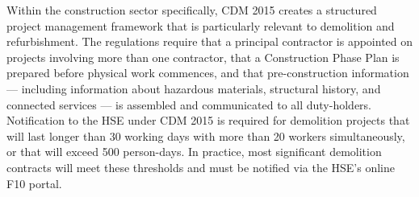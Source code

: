 Within the construction sector specifically, CDM 2015 creates a structured project management framework that is particularly relevant to demolition and refurbishment. The regulations require that a principal contractor is appointed on projects involving more than one contractor, that a Construction Phase Plan is prepared before physical work commences, and that pre-construction information — including information about hazardous materials, structural history, and connected services — is assembled and communicated to all duty-holders. Notification to the HSE under CDM 2015 is required for demolition projects that will last longer than 30 working days with more than 20 workers simultaneously, or that will exceed 500 person-days. In practice, most significant demolition contracts will meet these thresholds and must be notified via the HSE's online F10 portal.


